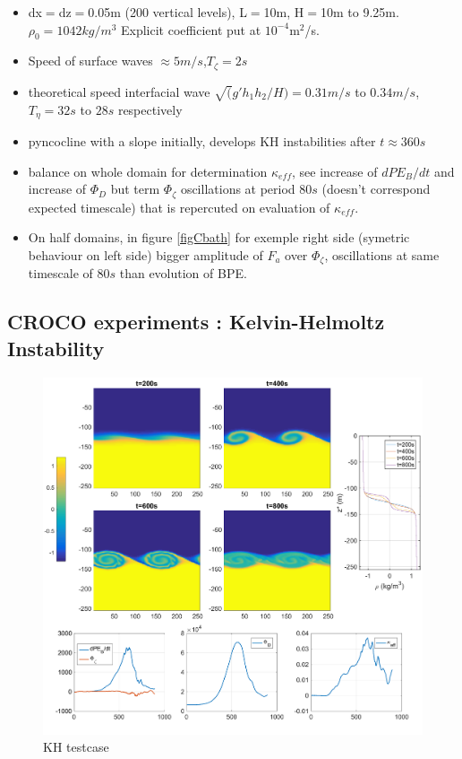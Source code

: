 \begin{itemize}
\item dx$=$dz$=$0.05m (200 vertical levels), L$=$10m, H$=$10m to 9.25m.$\rho_0=1042 kg/m^3$ Explicit coefficient put at $10^{-4}$m$^2$/s.
\item Speed of surface waves $\approx 5m/s$,$T_{\zeta}=2s$
\item theoretical speed interfacial wave  $\sqrt(g'h_1h_2/H)=0.31m/s$ to $0.34m/s$, $T_{\eta}=32s$ to $28s$ respectively
\item pyncocline with a slope initially, develops KH instabilities after $t \approx 360s$
\item balance on whole domain for determination $\kappa_{eff}$, see increase of $dPE_B/dt$ and increase of $\Phi_D$ but term $\Phi_{\zeta}$ oscillations at period $80s$ (doesn't correspond expected timescale) that is repercuted on evaluation of $\kappa_{eff}$. 
\item On half domains, in figure \ref{figCbath} for exemple right side (symetric behaviour on left side) bigger amplitude of $F_a$ over $\Phi_{\zeta}$, oscillations at same timescale of $80s$ than evolution of BPE.
\end{itemize}


\subsection{CROCO experiments : Kelvin-Helmoltz Instability}

\begin{figure}[h!]
\centering
\includegraphics[width=1\textwidth]{./CHAP_BPE/Fig_KH2.png}
\caption{KH testcase}
\label{figCkh}
\end{figure}

